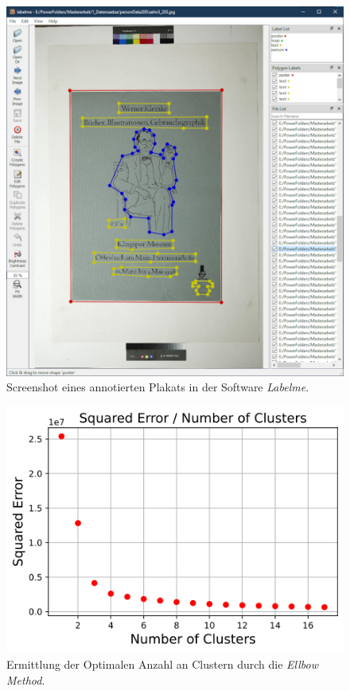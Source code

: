 \documentclass[a4paper,12pt,ngerman]{article}
\begin{document}
\newpage
\begin{figure}[ht]
\includegraphics[width=\linewidth]{Labelme_Screenshot}
\centering
\caption{Screenshot eines annotierten Plakats in der Software \textit{Labelme}.}
\end{figure}

\newpage
\begin{figure}[ht]
\includegraphics[width=\linewidth]{Ellbow_Method}
\centering
\caption{Ermittlung der Optimalen Anzahl an Clustern durch die \textit{Ellbow Method}.}
\end{figure}
\end{document}
